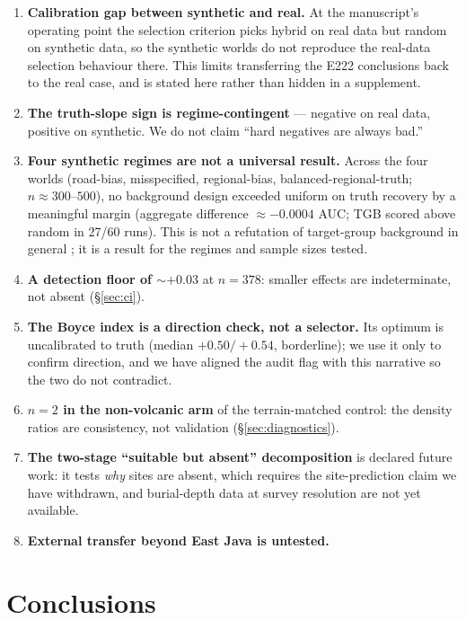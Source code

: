 \documentclass[12pt]{article}
\begin{document}
\begin{enumerate}
  \item \textbf{Calibration gap between synthetic and real.} At the manuscript's operating point the selection criterion picks hybrid on real data but random on synthetic data, so the synthetic worlds do not reproduce the real-data selection behaviour there. This limits transferring the E222 conclusions back to the real case, and is stated here rather than hidden in a supplement.
  \item \textbf{The truth-slope sign is regime-contingent} --- negative on real data, positive on synthetic. We do not claim ``hard negatives are always bad.''
  \item \textbf{Four synthetic regimes are not a universal result.} Across the four worlds (road-bias, misspecified, regional-bias, balanced-regional-truth; $n \approx 300$--$500$), no background design exceeded uniform on truth recovery by a meaningful margin (aggregate difference $\approx -0.0004$ AUC; TGB scored above random in 27/60 runs). This is not a refutation of target-group background in general \citep{phillips2009}; it is a result for the regimes and sample sizes tested.
  \item \textbf{A detection floor of $\sim +0.03$} at $n=378$: smaller effects are indeterminate, not absent (\S\ref{sec:ci}).
  \item \textbf{The Boyce index is a direction check, not a selector.} Its optimum is uncalibrated to truth (median $+0.50/+0.54$, borderline); we use it only to confirm direction, and we have aligned the audit flag with this narrative so the two do not contradict.
  \item \textbf{$n=2$ in the non-volcanic arm} of the terrain-matched control: the density ratios are consistency, not validation (\S\ref{sec:diagnostics}).
  \item \textbf{The two-stage ``suitable but absent'' decomposition} is declared future work: it tests \emph{why} sites are absent, which requires the site-prediction claim we have withdrawn, and burial-depth data at survey resolution are not yet available.
  \item \textbf{External transfer beyond East Java is untested.}
\end{enumerate}

\section{Conclusions}
\end{document}
